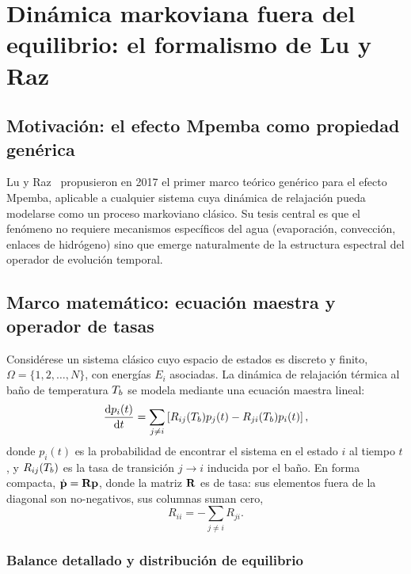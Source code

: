 \chapter{Dinámica markoviana fuera del equilibrio: el formalismo de Lu y Raz}
\label{ch:markoviano}

\section{Motivación: el efecto Mpemba como propiedad genérica}

Lu y Raz~\cite{lu2017} propusieron en 2017 el primer marco teórico genérico para 
el efecto Mpemba, aplicable a cualquier sistema cuya dinámica de relajación pueda 
modelarse como un proceso markoviano clásico. Su tesis central es que el 
fenómeno no requiere mecanismos específicos del agua (evaporación, convección, 
enlaces de hidrógeno) sino que emerge naturalmente de la estructura espectral del 
operador de evolución temporal.

\section{Marco matemático: ecuación maestra y operador de tasas}

Considérese un sistema clásico cuyo espacio de estados es discreto y finito, 
$\Omega = \{1, 2, \ldots, N\}$, con energías $E_{i}$ asociadas. La dinámica de 
relajación térmica al baño de temperatura $T_{b}$ se modela mediante una ecuación 
maestra lineal:
\begin{equation}
    \dv{p_{i}(t)}{t} = \sum_{j \neq i} \left[ R_{ij}(T_{b}) p_{j}(t) - R_{ji}(T_{b}) p_{i}(t) \right],
    \label{eq:master}
\end{equation}
%
donde $p_{i}(t)$ es la probabilidad de encontrar el sistema en el estado $i$ al 
tiempo $t$, y $R_{ij}(T_{b})$ es la tasa de transición $j \to i$ inducida por el 
baño. En forma compacta, $\dot{\vb{p}} = \vb{R} \vb{p}$, donde la matriz $\vb{R}$ 
es de tasa: sus elementos fuera de la diagonal son no-negativos, sus columnas 
suman cero,
\begin{equation}
    R_{ii} = -\sum_{j \neq i} R_{ji}.
\end{equation}

\subsection{Balance detallado y distribución de equilibrio}

